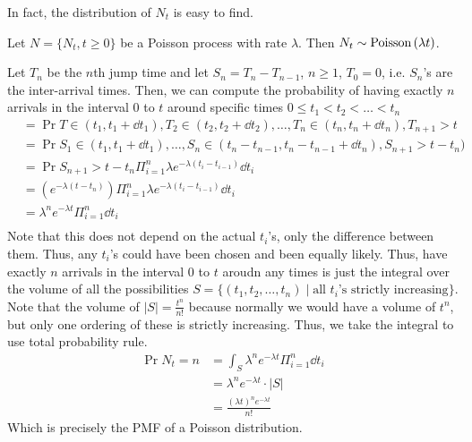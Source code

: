 In fact, the distribution of $N_t$ is easy to find.
\begin{theorem}
    Let $N = \{N_t, t \geq 0\}$ be a Poisson process with rate $\lambda$. Then $N_t \sim \text{Poisson}\left( \lambda t \right)$.

    \begin{proof*}
        Let $T_n$ be the $n$th jump time and let $S_n = T_n - T_{n - 1}$, $n \geq 1$, $T_0 = 0$,
        i.e. $S_n$'s are the inter-arrival times. Then, we can compute the probability of having exactly $n$ arrivals
        in the interval 0 to $t$ around specific times $0 \leq t_1 < t_2 < \dots < t_n$
        \begin{align*}
            &= \Pr{T \in (t_1, t_1 + \dd{t_1}), T_2 \in (t_2, t_2 + \dd{t_2}), \dots, T_n \in (t_n, t_n + \dd{t_n}), T_{n + 1} > t} \\
            &= \Pr{S_1 \in (t_1, t_1 + \dd{t_1}), \dots, S_n \in (t_n - t_{n - 1}, t_{n} - t_{n - 1} + \dd{t_n}), S_{n + 1} > t - t_n)} \\
            &= \Pr{S_{n + 1} > t - t_n} \Pi_{i = 1}^n \lambda e^{-\lambda (t_i - t_{i - 1})} \dd{t_i} \\
            &= (e^{-\lambda(t - t_n)}) \Pi_{i = 1}^n \lambda e^{-\lambda (t_i - t_{i - 1})} \dd{t_i} \\
            &= \lambda^n e^{-\lambda t} \Pi_{i = 1}^n \dd{t_i} \\
        \end{align*}
        Note that this does not depend on the actual $t_i$'s, only the difference between them. Thus,
        any $t_i$'s could have been chosen and been equally likely. Thus, have exactly $n$ arrivals in the interval 0 to $t$
        aroudn any times is just the integral over the volume of all the possibilities $S = \{(t_1, t_2, \dots, t_n) \mid \text{all $t_i$'s strictly increasing}\}$. 
        Note that the volume of $|S| = \frac{t^n}{n!}$ because normally we would have a volume of $t^n$, but only one ordering of these is strictly increasing.
        Thus, we take the integral to use total probability rule.
        \begin{align*}
            \Pr{N_t = n} &= \int_{S} \lambda^n e^{-\lambda t} \Pi_{i = 1}^n \dd{t_i} \\
            &= \lambda^n e^{-\lambda t} \cdot |S| \\
            &= \frac{(\lambda t)^n e^{-\lambda t}}{n!}
        \end{align*}
        Which is precisely the PMF of a Poisson distribution.
    \end{proof*}
\end{theorem}

